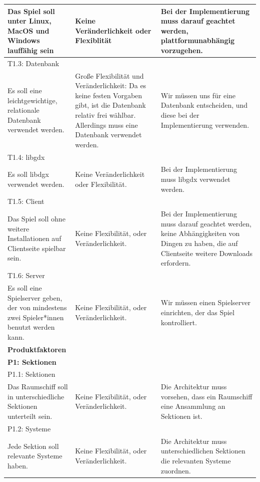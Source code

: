 \documentclass[fontsize=12pt,paper=a4,twoside]{scrartcl}
\begin{document}
\begin{longtable}[c]{|p{5cm}|p{5cm}|p{5cm}|}
Das Spiel soll unter Linux, MacOS und Windows lauffähig sein & Keine Veränderlichkeit oder Flexiblität  & Bei der Implementierung muss darauf geachtet werden, plattformunabhängig vorzugehen. 
\\ \hline
\multicolumn{3}{|l|}{{T1.3: Datenbank}} 
\\ \hline
Es soll eine leichtgewichtige, relationale Datenbank verwendet werden. & Große Flexibilität und Veränderlichkeit: Da es keine festen Vorgaben gibt, ist die Datenbank relativ frei wählbar. Allerdings muss eine Datenbank verwendet werden. & Wir müssen uns für eine Datenbank entscheiden, und diese bei der Implementierung verwenden. 
\\ \hline
\multicolumn{3}{|l|}{{T1.4: libgdx}} 
\\ \hline
Es soll libdgx verwendet werden. & Keine Veränderlichkeit oder Flexibilität.   & Bei der Implementierung muss libgdx verwendet werden. 
\\ \hline
\multicolumn{3}{|l|}{{T1.5: Client}} 
\\ \hline
Das Spiel soll ohne weitere Installationen auf Clientseite spielbar sein. & Keine Flexibilität, oder Veränderlichkeit.    &  Bei der Implementierung muss darauf geachtet werden, keine Abhängigkeiten von Dingen zu haben, die auf Clientseite weitere Downloads erfordern. 
\\ \hline
\multicolumn{3}{|l|}{{T1.6: Server}} 
\\ \hline
Es soll eine Spielserver geben, der von mindestens zwei Spieler*innen benutzt werden kann. & Keine Flexibilität, oder Veränderlichkeit.    & Wir müssen einen Spielserver einrichten, der das Spiel kontrolliert. 
\\ \hline
\multicolumn{3}{|l|}{{\textbf{Produktfaktoren}}} 
\\ \hline
%
\multicolumn{3}{|l|}{{\textbf{P1: Sektionen}}} 
\\ \hline
\multicolumn{3}{|l|}{{P1.1: Sektionen}} 
\\ \hline
Das Raumschiff soll in unterschiedliche Sektionen unterteilt sein. & Keine Flexibilität, oder Veränderlichkeit.    & Die Architektur muss vorsehen, dass ein Raumschiff eine Ansammlung an Sektionen ist. 
\\ \hline 
\multicolumn{3}{|l|}{{P1.2: Systeme}} 
\\ \hline
Jede Sektion soll relevante Systeme haben.  & Keine Flexibilität, oder Veränderlichkeit.    & Die Architektur muss unterschiedlichen Sektionen die relevanten Systeme zuordnen. 
\\ \hline

\end{longtable}
\end{document}
